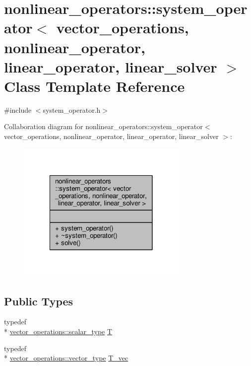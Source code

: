 \hypertarget{classnonlinear__operators_1_1system__operator}{\section{nonlinear\-\_\-operators\-:\-:system\-\_\-operator$<$ vector\-\_\-operations, nonlinear\-\_\-operator, linear\-\_\-operator, linear\-\_\-solver $>$ Class Template Reference}
\label{classnonlinear__operators_1_1system__operator}
}


{\ttfamily \#include $<$system\-\_\-operator.\-h$>$}



Collaboration diagram for nonlinear\-\_\-operators\-:\-:system\-\_\-operator$<$ vector\-\_\-operations, nonlinear\-\_\-operator, linear\-\_\-operator, linear\-\_\-solver $>$\-:
\nopagebreak
\begin{figure}[H]
\begin{center}
\leavevmode
\includegraphics[width=234pt]{classnonlinear__operators_1_1system__operator__coll__graph}
\end{center}
\end{figure}
\subsection*{Public Types}
\begin{DoxyCompactItemize}
\item 
typedef \\*
\hyperlink{structcpu__vector__operations_aca6b216aa1fb172df83d98350e94fd61}{vector\-\_\-operations\-::scalar\-\_\-type} \hyperlink{classnonlinear__operators_1_1system__operator_ace913d6e3749a1c318f2e3654e9f570e}{T}
\item 
typedef \\*
\hyperlink{structcpu__vector__operations_a1962836df596ce262704d208e9a6d8f9}{vector\-\_\-operations\-::vector\-\_\-type} \hyperlink{classnonlinear__operators_1_1system__operator_a87719a3fbcb842cc1f8305c59e17cbae}{T\-\_\-vec}
\end{DoxyCompactItemize}
